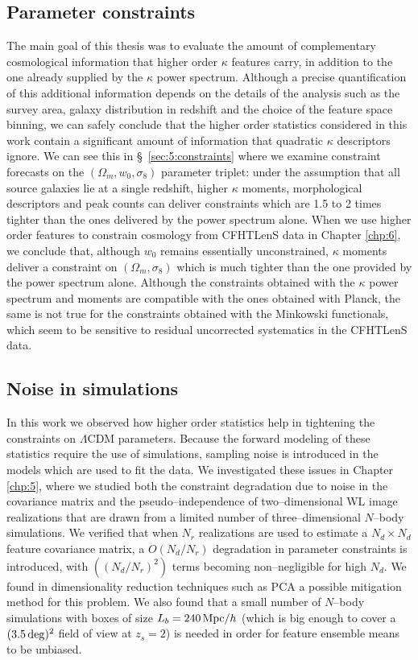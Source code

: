 \subsection{Parameter constraints}
The main goal of this thesis was to evaluate the amount of complementary cosmological information that higher order $\kappa$ features carry, in addition to the one already supplied by the $\kappa$ power spectrum. Although a precise quantification of this additional information depends on the details of the analysis such as the survey area, galaxy distribution in redshift and the choice of the feature space binning, we can safely conclude that the higher order statistics considered in this work contain a significant amount of information that quadratic $\kappa$ descriptors ignore. We can see this in \S~\ref{sec:5:constraints} where we examine constraint forecasts on the $(\Omega_m,w_0,\sigma_8)$ parameter triplet: under the assumption that all source galaxies lie at a single redshift, higher $\kappa$ moments, morphological descriptors and peak counts can deliver constraints which are 1.5 to 2 times tighter than the ones delivered by the power spectrum alone. When we use higher order features to constrain cosmology from CFHTLenS data in Chapter \ref{chp:6}, we conclude that, although $w_0$ remains essentially unconstrained, $\kappa$ moments deliver a constraint on $(\Omega_m,\sigma_8)$ which is much tighter than the one provided by the power spectrum alone. Although the constraints obtained with the $\kappa$ power spectrum and moments are compatible with the ones obtained with Planck, the same is not true for the constraints obtained with the Minkowski functionals, which seem to be sensitive to residual uncorrected systematics in the CFHTLenS data. 

\subsection{Noise in simulations}
In this work we observed how higher order statistics help in tightening the constraints on $\Lambda$CDM parameters. Because the forward modeling of these statistics require the use of simulations, sampling noise is introduced in the models which are used to fit the data. We investigated these issues in Chapter \ref{chp:5}, where we studied both the constraint degradation due to noise in the covariance matrix and the pseudo--independence of two--dimensional WL image realizations that are drawn from a limited number of three--dimensional $N$--body simulations. We verified that when $N_r$ realizations are used to estimate a $N_d\times N_d$ feature covariance matrix, a $O(N_d/N_r)$ degradation in parameter constraints is introduced, with $((N_d/N_r)^2)$ terms becoming non--negligible for high $N_d$. We found in dimensionality reduction techniques such as PCA a possible mitigation method for this problem. We also found that a small number of $N$--body simulations with boxes of size $L_b=240\,{\rm Mpc}/h$ (which is big enough to cover a $(3.5\,{\rm deg})^2$ field of view at $z_s=2$) is needed in order for feature ensemble means to be unbiased.  

